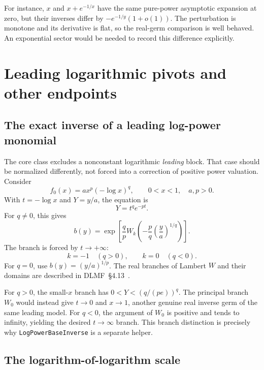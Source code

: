 \documentclass[11pt,a4paper]{article}
\numberwithin{equation}{section}
\theoremstyle{definition}
\theoremstyle{remark}
\newcommand{\code}[1]{\texttt{#1}}
\begin{document}
For instance, $x$ and $x+e^{-1/x}$ have the same pure-power asymptotic
expansion at zero, but their inverses differ by
$-e^{-1/y}(1+o(1))$. The perturbation is monotone and its derivative is flat,
so the real-germ comparison is well behaved. An exponential sector would
be needed to record this difference explicitly.

\section{Leading logarithmic pivots and other endpoints}
\label{sec:leadinglog}

\subsection{The exact inverse of a leading log-power monomial}

The core class excludes a nonconstant logarithmic \emph{leading} block.
That case should be normalized differently, not forced into a correction
of positive power valuation. Consider
\begin{equation}\label{eq:leadinglog}
 f_0(x)=a x^p(-\log x)^q,\qquad 0<x<1,\quad a,p>0.
\end{equation}
With $t=-\log x$ and $Y=y/a$, the equation is
\[
 Y=t^q e^{-pt}.
\]
For $q\ne0$, this gives
\begin{equation}\label{eq:Wbase}
 b(y)=\exp\left[\frac qp
 W_k\left(-\frac pq\left(\frac ya\right)^{1/q}\right)\right].
\end{equation}
The branch is forced by $t\to+\infty$:
\[
 k=-1\quad(q>0),\qquad k=0\quad(q<0).
\]
For $q=0$, use $b(y)=(y/a)^{1/p}$. The real branches of Lambert $W$ and
their domains are described in DLMF~\S4.13~\cite{dlmfw}.

For $q>0$, the small-$x$ branch has
$0<Y<(q/(pe))^q$. The principal branch $W_0$ would instead give $t\to0$
and $x\to1$, another genuine real inverse germ of the same leading model.
For $q<0$, the argument of $W_0$ is positive and tends to infinity, yielding
the desired $t\to\infty$ branch. This branch distinction is precisely why
\code{LogPowerBaseInverse} is a separate helper.

\subsection{The logarithm-of-logarithm scale}
\end{document}
